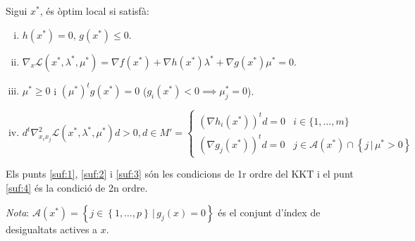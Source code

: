 \begin{prop}
    Sigui $x^*$, \'es \`optim local si satisf\`a:
    \begin{enumerate}[i)]
        \item \label{suf:1} $h\left( x^* \right) = 0,\, g\left( x^* \right) \leq 0$.
        \item \label{suf:2} $\nabla_x \mathcal{L} \left( x^*, \lambda^*, \mu^* \right) = \nabla f\left( x^* \right) + \nabla h\left( x^* \right)\lambda^* + \nabla g\left( x^* \right)\mu^* = 0$.
        \item \label{suf:3} $\mu^* \geq 0$ i $\left( \mu^* \right)^t g\left( x^* \right) = 0$ ($g_i\left( x^* \right) < 0 \implies \mu_j^* = 0$).
        \item \label{suf:4} $d^t \nabla_{x_ix_j}^2 \mathcal{L}\left( x^*, \lambda^*, \mu^* \right) d > 0, d \in M' =
            \begin{cases}
                \left( \nabla h_i\left( x^* \right) \right)^t d = 0 & i \in \{1,\dots,m\} \\
                \left( \nabla g_j\left( x^* \right) \right)^t d = 0 & j \in \mathcal{A}\left( x^* \right) \cap \left\{ j \,|\, \mu^* > 0 \right\}
            \end{cases}$ \\
    \end{enumerate}
    Els punts \ref{suf:1}, \ref{suf:2} i \ref{suf:3} s\'on les condicions de 1r ordre del KKT i el punt \ref{suf:4} \'es la condici\'o de 2n ordre.
    \begin{adjustwidth}{1cm}{}
    {\it Nota}: $\mathcal{A}\left( x^* \right) = \left\{ j \in \left\{ 1, \dots, p \right\} \, |\, g_j \left( x \right) = 0\right\}$ \'es el conjunt d'\'index de desigualtats actives a $x$.
    \end{adjustwidth}
\end{prop}
